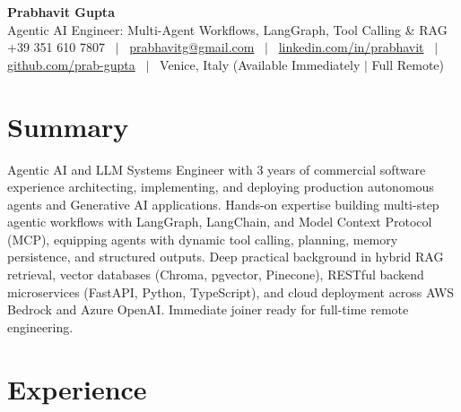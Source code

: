 \documentclass[a4paper,10pt]{article}
\begin{document}
\begin{minipage}[c]{0.80\textwidth}
  {\Huge\bfseries Prabhavit Gupta}\\[3pt]
  {\color{accent}\large Agentic AI Engineer: Multi-Agent Workflows, LangGraph, Tool Calling \& RAG}\\[6pt]
  {\footnotesize +39 351 610 7807 ~$\vert$~
  \href{mailto:prabhavitg@gmail.com}{prabhavitg@gmail.com} ~$\vert$~
  \href{https://www.linkedin.com/in/prabhavit/}{linkedin.com/in/prabhavit} ~$\vert$~
  \href{https://github.com/prab-gupta}{github.com/prab-gupta} ~$\vert$~
  Venice, Italy (Available Immediately $\vert$ Full Remote)}
\end{minipage}\hfill

\section{Summary}
Agentic AI and LLM Systems Engineer with 3 years of commercial software experience architecting, implementing, and deploying production autonomous agents and Generative AI applications. Hands-on expertise building multi-step agentic workflows with LangGraph, LangChain, and Model Context Protocol (MCP), equipping agents with dynamic tool calling, planning, memory persistence, and structured outputs. Deep practical background in hybrid RAG retrieval, vector databases (Chroma, pgvector, Pinecone), RESTful backend microservices (FastAPI, Python, TypeScript), and cloud deployment across AWS Bedrock and Azure OpenAI. Immediate joiner ready for full-time remote engineering.

\section{Experience}
\end{document}
